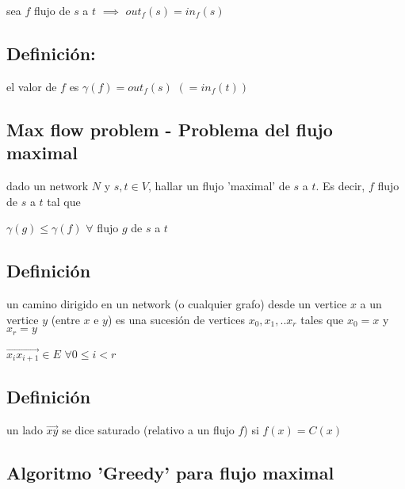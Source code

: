 \documentclass[12pt]{article}
\begin{document}
sea $f$ flujo de $s$ a $t$ $\implies$ $out_{f}(s) = in_{f}(s)$

\subsection*{Definición:}

el valor de $f$ es $\gamma(f) = out_f(s)$       $(=in_f(t))$

\subsection*{Max flow problem - Problema del flujo maximal}

dado un network $N$ y $s, t \in V$, hallar un flujo 'maximal' de $s$ a $t$. Es decir, $f$ flujo de $s$ a $t$ tal que 

$\gamma(g) \leq \gamma(f)$ $\forall$ flujo $g$ de $s$ a $t$


\subsection*{Definición}

un camino dirigido en un network (o cualquier grafo) desde un vertice $x$ a un vertice $y$ (entre $x$ e $y$) es una sucesión de vertices $x_0,x_1, .. x_r$ tales que $x_0 = x$ y $x_r = y$

$\overrightarrow{x_{i}x_{i+1}} \in E $    $\forall 0 \leq i < r$


\subsection*{Definición}

un lado $\overrightarrow{xy}$ se dice saturado (relativo a un flujo $f$) si $f(x) = C(x)$

\subsection*{Algoritmo 'Greedy' para flujo maximal}
\end{document}
